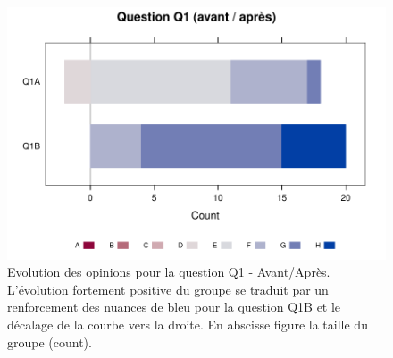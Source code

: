 \documentclass[12pt,english,french]{article}\usepackage{graphicx, color}
\makeatletter
\def\maxwidth{ %
  \ifdim\Gin@nat@width>\linewidth
    \linewidth
  \else
    \Gin@nat@width
  \fi
}
\newenvironment{knitrout}{}{} %
\makeatother
\begin{document}
\begin{figure}
\begin{center}
\begin{knitrout}
\color{fgcolor}
\includegraphics[width=\maxwidth]{figure/likert_Q1} 

\end{knitrout}

\end{center}
\caption{Evolution des opinions pour la question Q1 - Avant/Après. L'évolution fortement positive du groupe se traduit par un renforcement des nuances de bleu pour la question Q1B et le décalage de la courbe vers la droite. En abscisse figure la taille du groupe (count).}
\label{Q1_likert}
\end{figure}

 

\end{document}
